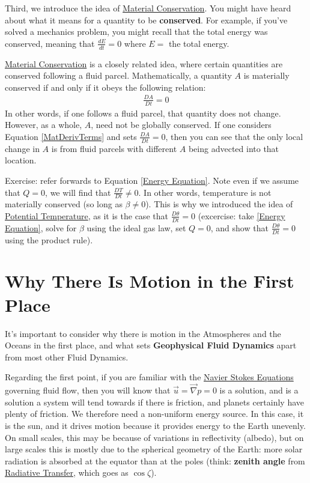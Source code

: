 Third, we introduce the idea of \hyperref[Material Conservation]{Material Conservation}. You might have heard about what it means for a quantity to be \textbf{conserved}. For example, if you've solved a mechanics problem, you might recall that the total energy was conserved, meaning that $\frac{dE}{dt}=0$ where $E=$ the total energy.

\hyperref[Material Conservation]{Material Conservation} is a closely related idea, where certain quantities are conserved following a fluid parcel. Mathematically, a quantity $A$ is materially conserved if and only if it obeys the following relation:
\begin{align}\label{Material Conservation}
    \frac{D A}{Dt }=0
\end{align}
In other words, if one follows a fluid parcel, that quantity does not change. However, as a whole, $A$, need not be globally conserved. If one considers Equation \ref{MatDerivTerms} and sets $\frac{D A}{Dt }=0$, then you can see that the only local change in $A$ is from fluid parcels with different $A$ being advected into that location.

Exercise: refer forwards to Equation \ref{Energy Equation}. Note even if we assume that $Q=0$, we will find that $\frac{DT}{Dt}\neq 0$. In other words, temperature is not materially conserved (so long as $\beta\neq0$). This is why we introduced the idea of \hyperref[Potential Temperature]{Potential Temperature}, as it is the case that $\frac{D\theta}{Dt}=0$ (excercise: take \ref{Energy Equation}, solve for $\beta$ using the ideal gas law, set $Q=0$, and show that $\frac{D\theta}{Dt}=0$ using the product rule).

\section{Why There Is Motion in the First Place}

It's important to consider why there is motion in the Atmospheres and the Oceans in the first place, and what sets \textbf{Geophysical Fluid Dynamics} apart from most other Fluid Dynamics.

Regarding the first point, if you are familiar with the \hyperref[Navier Stokes]{Navier Stokes Equations} governing fluid flow, then you will know that $\vec{u}=\vec{\nabla}p=0$ is a solution, and is a solution a system will tend towards if there is friction, and planets certainly have plenty of friction. We therefore need a non-uniform energy source. In this case, it is the sun, and it drives motion because it provides energy to the Earth unevenly. On small scales, this may be because of variations in reflectivity (albedo), but on large scales this is mostly due to the spherical geometry of the Earth: more solar radiation is absorbed at the equator than at the poles (think: \textbf{zenith angle} from \hyperref[Radiative Transfer]{Radiative Transfer}, which goes as $\cos\zeta$).

